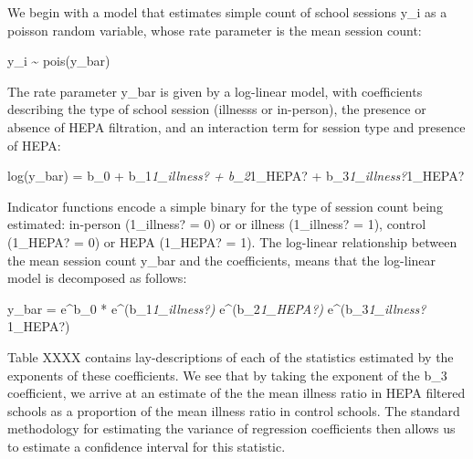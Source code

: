 \documentclass[11pt]{article}
\begin{document}
We begin with a model that estimates simple count of school sessions
y\_i as a poisson random variable, whose rate parameter is the mean
session count:

y\_i \textasciitilde{} pois(y\_bar)

The rate parameter y\_bar is given by a log-linear model, with
coefficients describing the type of school session (illnesss or
in-person), the presence or absence of HEPA filtration, and an
interaction term for session type and presence of HEPA:

log(y\_bar) = b\_0 + b\_1\emph{1\_illness? + b\_2}1\_HEPA? +
b\_3\emph{1\_illness?}1\_HEPA?

Indicator functions encode a simple binary for the type of session count
being estimated: in-person (1\_illness? = 0) or or illness (1\_illness?
= 1), control (1\_HEPA? = 0) or HEPA (1\_HEPA? = 1). The log-linear
relationship between the mean session count y\_bar and the coefficients,
means that the log-linear model is decomposed as follows:

y\_bar = e\^{}b\_0 * e\^{}(b\_1\emph{1\_illness?) }
e\^{}(b\_2\emph{1\_HEPA?) } e\^{}(b\_3\emph{1\_illness?}1\_HEPA?)

Table XXXX contains lay-descriptions of each of the statistics estimated
by the exponents of these coefficients. We see that by taking the
exponent of the b\_3 coefficient, we arrive at an estimate of the the
mean illness ratio in HEPA filtered schools as a proportion of the mean
illness ratio in control schools. The standard methodology for
estimating the variance of regression coefficients then allows us to
estimate a confidence interval for this statistic.
\end{document}
